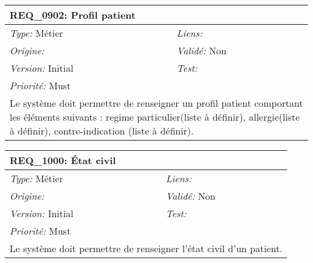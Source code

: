 \begin{table}[!h]

\begin{tabular}{|p{60mm}p{100mm}|}

\hline

\multicolumn{2}{|l|}{\textbf{REQ\_0902:} Profil patient} \\ \hline

\emph{Type:} Métier & \emph{Liens:}  \\

\emph{Origine:}  & \emph{Validé:} Non \\

\emph{Version:} Initial & \emph{Test:}  \\

\emph{Priorité:} Must & \\ \hline

\multicolumn{2}{|p{16cm}|}{Le système doit permettre de renseigner un profil patient comportant les éléments suivants : regime particulier(liste à définir), allergie(liste à définir), contre-indication (liste à définir).} \\ \hline

\end{tabular}

\end{table}



\begin{table}[!h]

\begin{tabular}{|p{60mm}p{100mm}|}

\hline

\multicolumn{2}{|l|}{\textbf{REQ\_1000:} État civil} \\ \hline

\emph{Type:} Métier & \emph{Liens:}  \\

\emph{Origine:}  & \emph{Validé:} Non \\

\emph{Version:} Initial & \emph{Test:}  \\

\emph{Priorité:} Must & \\ \hline

\multicolumn{2}{|p{16cm}|}{Le système doit permettre de renseigner l'état civil d'un patient.} \\ \hline

\end{tabular}

\end{table}



